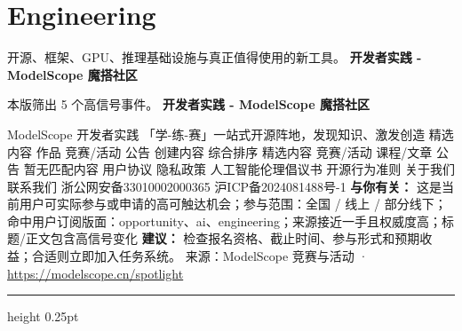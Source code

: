 \documentclass[10.5pt]{ctexart}
\begin{document}
\section*{Engineering}
{\color{ormuted} 开源、框架、GPU、推理基础设施与真正值得使用的新工具。}
\vspace{2mm}
{\LARGE\bfseries 开发者实践 - ModelScope 魔搭社区}\par
\vspace{1mm}
{\color{ormuted} 本版筛出 5 个高信号事件。}
\vspace{3mm}
{\Large\bfseries 开发者实践 - ModelScope 魔搭社区}\par
ModelScope 开发者实践 「学-练-赛」一站式开源阵地，发现知识、激发创造 精选内容 作品 竞赛/活动 公告 创建内容 综合排序 精选内容 竞赛/活动 课程/文章 公告 暂无匹配内容 用户协议 隐私政策 人工智能伦理倡议书 开源行为准则 关于我们 联系我们 浙公网安备33010002000365 沪ICP备2024081488号-1
\textbf{与你有关：} 这是当前用户可实际参与或申请的高可触达机会；参与范围：全国 / 线上 / 部分线下；命中用户订阅版面：opportunity、ai、engineering；来源接近一手且权威度高；标题/正文包含高信号变化
\textbf{建议：} 检查报名资格、截止时间、参与形式和预期收益；合适则立即加入任务系统。
{\footnotesize\color{ormuted} 来源：ModelScope 竞赛与活动 · \url{https://modelscope.cn/spotlight}}
\vspace{4mm}
\hrule height 0.25pt
\vspace{3mm}
\end{document}

